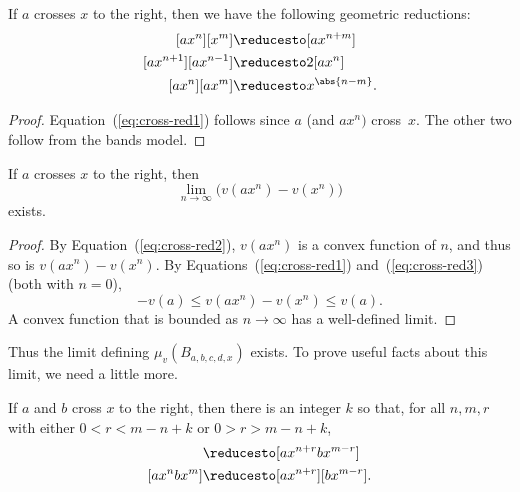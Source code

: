 \begin{lemma}
  If $a$ crosses $x$ to the right, then we have the following
  geometric reductions:
  \begin{align}
    \label{eq:cross-red1}[a x^n][x^m] &\reducesto [a x^{n+m}]\\
    \label{eq:cross-red2}[a x^{n+1}][a x^{n-1}] &\reducesto 2[a x^n]\\
    \label{eq:cross-red3}[a x^n][a x^m] & \reducesto x^{\abs{n-m}}.
  \end{align}
\end{lemma}
\begin{proof}
  Equation~(\ref{eq:cross-red1}) follows since $a$ (and $a x^n)$
  cross~$x$. The other two follow from the bands model.
\end{proof}

\begin{corollary}\label{cor:additivity-limit}
  If $a$ crosses $x$ to the right, then
  \[
    \lim_{n \to \infty} \bigl(v(a x^n) - v(x^n)\bigr)
  \]
  exists.
\end{corollary}

\begin{proof}
  By Equation~(\ref{eq:cross-red2}), $v(a x^n)$ is a convex function
  of $n$, and thus so is $v(a x^n) - v(x^n)$. By
  Equations~(\ref{eq:cross-red1}) and~(\ref{eq:cross-red3}) (both with
  $n=0$),
  \[
    -v(a) \le v(a x^n) - v(x^n) \le v(a).
  \]
  A convex function that is bounded as $n \to \infty$ has a
  well-defined limit.
\end{proof}

Thus the limit defining $\mu_{v}(B_{a,b,c,d,x})$ exists. To prove
useful facts about this limit, we need a little more.

\begin{lemma}\label{lem:join-split-geom}
  If $a$ and $b$ cross $x$ to the right, then there is an integer $k$
  so that, for all $n,m,r$ with either $0 < r < m-n+k$ or $0 > r > m-n+k$,
  \begin{align*}
    [a x^n] [b x^m] &\reducesto [ax^{n+r}bx^{m-r}]\\
    [a x^nb x^m] &\reducesto [ax^{n+r}][bx^{m-r}].
  \end{align*}
\end{lemma}

\begin{figure}
\end{figure}

